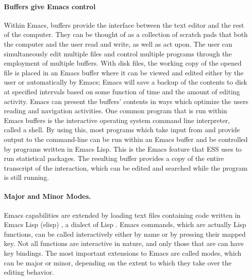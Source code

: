 \documentclass{article}
\begin{document}
\paragraph{Buffers give Emacs control}%
Within Emacs, buffers provide the interface between the text editor
and the rest of the computer.  They can be thought of as a collection
of scratch pads that both the computer and the user read and write, as
well as act upon.  The user can simultaneously edit multiple files and
control multiple programs through the employment of multiple buffers.
With disk files, the working copy of the opened file is placed in an
Emacs buffer where it can be viewed and edited either by the user or
automatically by Emacs; Emacs will save a backup of the contents to disk at
specified intervals based on some function of time and the amount of
editing activity.  Emacs can present the buffers' contents in ways
which optimize the users reading and navigation activities.  One
common program that is run within Emacs buffers is the interactive
operating system command line interpreter, called a shell.  By using
this, most programs which take input from and provide output to the
command-line can be run within an Emacs buffer and be
controlled by programs written in Emacs Lisp.  This is the Emacs feature
that ESS uses to run statistical packages.
The resulting buffer provides a copy of the entire transcript of the
interaction, which can be edited and searched while the program is
still running.  %

\paragraph{Major and Minor Modes.}
\label{sec:modes}
Emacs capabilities are extended by loading text files containing code
written in Emacs Lisp (elisp) \citep{RChassell1999}, a dialect of Lisp
\citep{PGraham:1996}.  Emacs commands, which are actually Lisp
functions, can be called interactively either by name or by pressing
their mapped key.  Not all functions are interactive in nature, and
only those that are can have key bindings.  The most important
extensions to Emacs are called modes, which can be major or minor,
depending on the extent to which they take over the editing behavior.
\end{document}
